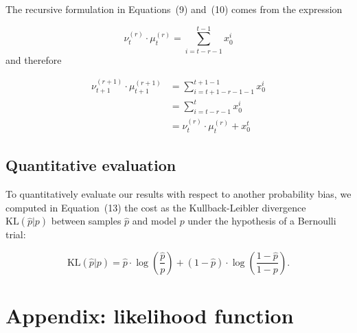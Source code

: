 \documentclass[10pt,letterpaper]{article}
\newcommand{\KL}[2]{\text{KL}( #1 | #2 )}
\newcommand{\pa}[1]{\left( #1 \right)}
\newcommand{\eq}[1]{\begin{equation*}#1\end{equation*}}
\newcommand{\eqs}[1]{\begin{align*}#1\end{align*}}
\newcommand{\seeEq}[1]{Equation~\ref{eq:#1}}
\newcommand{\seeApp}[1]{Appendix~\ref{app:#1}}
\begin{document}
The recursive formulation in Equations~(9) %
 and~(10)%
 comes from the expression

 \eq{
\nu^{(r)}_{t} \cdot \mu^{(r)}_{t} = \sum_{i=t-r-1}^{t-1} x_0^i %
}
and therefore

\eqs{
\nu^{(r+1)}_{t+1} \cdot \mu^{(r+1)}_{t+1} 	&= \sum_{i=t+1-r-1-1}^{t+1-1} x_0^i  \\%
											&=  \sum_{i=t-r-1}^{t} x_0^i  \\%
											&= \nu^{(r)}_{t} \cdot  \mu^{(r)}_{t} +  x_0^t
}

%
%

\subsection{Quantitative evaluation}

To quantitatively evaluate our results with respect to another probability bias, we computed in Equation~(13)%
the cost as the Kullback-Leibler divergence  $\KL{\hat p}{p}$ between samples $\hat p$ and model $p$ under the hypothesis of a Bernoulli trial:

\begin{equation}
\KL{\hat p}{p} = \hat{p} \cdot\log\pa{\frac{\hat p}{p}} + (1-\hat p)\cdot \log\pa{\frac{1-\hat p}{1-p}}.
\end{equation}


\section{Appendix: likelihood function}
\label{app:likelihood}
\end{document}
